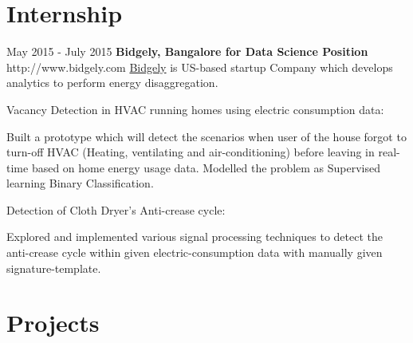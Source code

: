 \documentclass[10pt]{article} %
\begin{document}
\section{Internship}
\job
{\normalsize May 2015 - }{\normalsize July 2015}
{\bf \large Bidgely, Bangalore for Data Science Position}
{http://www.bidgely.com}
{\normalsize \href {http://www.bidgely.com} {Bidgely} is US-based startup Company which develops analytics to perform energy disaggregation.}
{
\begin{compactitem}
 {\bf \item Vacancy Detection in HVAC running homes using electric consumption data: }
	\begin{compactitem}
	\item Built a prototype which will detect the scenarios when user of the house forgot to turn-off  HVAC (Heating, ventilating and 		air-conditioning) before leaving in real-time based on home energy usage data. Modelled the problem as Supervised learning Binary Classification.
	\end{compactitem}
			
 {\bf   \item Detection of Cloth Dryer’s Anti-crease cycle: }
 	\begin{compactitem}
	\item Explored and implemented various signal processing techniques to detect the anti-crease cycle within given electric-consumption data with manually given signature-template.
	\end{compactitem}
\end{compactitem}
}



\enlargethispage{-\baselineskip}
\section{Projects}
\end{document}
